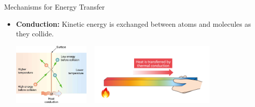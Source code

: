 \documentclass{beamer}
\begin{document}
\begin{frame}{Mechanisms for Energy Transfer}
\begin{itemize}
   \item {\bf Conduction:} Kinetic energy is exchanged between atoms and molecules as they collide.
   \begin{center}
      \includegraphics[height=3cm]{figures/conduction1.jpg}
      ~
      \includegraphics[height=3cm]{figures/conduction2.png}
   \end{center}
\end{itemize}
\end{frame}
\end{document}
